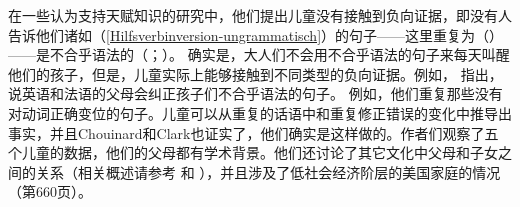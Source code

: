 在一些认为支持天赋知识的研究中，他们提出儿童没有接触到负向证据，即没有人告诉他们诸如（\ref{Hilfsverbinversion-ungrammatisch}）的句子——这里重复为（）——是不合乎语法的（\citealp[--52]{BH70a}；\citealp{Marcus93a}）。
\z
确实是，大人们不会用不合乎语法的句子来每天叫醒他们的孩子，但是，儿童实际上能够接触到不同类型的负向证据。例如， \citet{CC2003a}指出，说英语和法语的父母会纠正孩子们不合乎语法的句子。
例如，他们重复那些没有对动词正确变位的句子。儿童可以从重复的话语中和重复修正错误的变化中推导出事实，并且Chouinard和Clark也证实了，他们确实是这样做的。作者们观察了五个儿童的数据，他们的父母都有学术背景。他们还讨论了其它文化中父母和子女之间的关系（相关概述请参考 和 ），并且涉及了低社会经济阶层的美国家庭的情况（第660页）。

